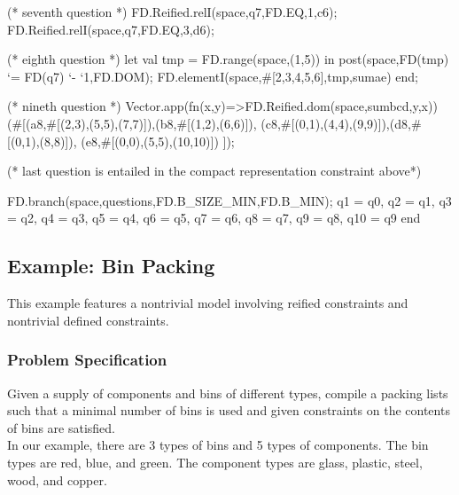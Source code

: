 \documentclass[a4paper]{scrartcl}
\begin{document}
\begin{myverbatim}
       (* seventh question *)
        FD.Reified.relI(space,q7,FD.EQ,1,c6);
        FD.Reified.relI(space,q7,FD.EQ,3,d6);
            
       (* eighth question *)
        let 
            val tmp = FD.range(space,(1,5))
        in 
            post(space,FD(tmp) `= FD(q7) `- `1,FD.DOM);
            FD.elementI(space,#[2,3,4,5,6],tmp,sumae)
        end;
            
       (* nineth question *)
        Vector.app(fn(x,y)=>FD.Reified.dom(space,sumbcd,y,x))
                 (#[(a8,#[(2,3),(5,5),(7,7)]),(b8,#[(1,2),(6,6)]),
                    (c8,#[(0,1),(4,4),(9,9)]),(d8,#[(0,1),(8,8)]),
                    (e8,#[(0,0),(5,5),(10,10)]) ]); 
          
        (* last question is entailed in the compact representation 
           constraint above*) 
            
        FD.branch(space,questions,FD.B_SIZE_MIN,FD.B_MIN);
       {q1 = q0, q2 = q1, q3 = q2, q4 = q3, q5 = q4, q6 = q5,
        q7 = q6, q8 = q7, q9 = q8, q10 = q9}
    end

\end{myverbatim}

\newpage
\subsection{Example: Bin Packing}
\label{sec8-4}
This example features a nontrivial model involving reified 
constraints and nontrivial defined constraints. 

\subsubsection{Problem Specification}
Given a supply of components and bins of different types, 
compile a packing lists such that a minimal number of bins 
is used and given constraints on the contents of bins are satisfied.\\

In our example, there are 3 types of bins and 5 types of components. 
The bin types are red, blue, and green. The component types are 
glass, plastic, steel, wood, and copper.\\
\end{document}
